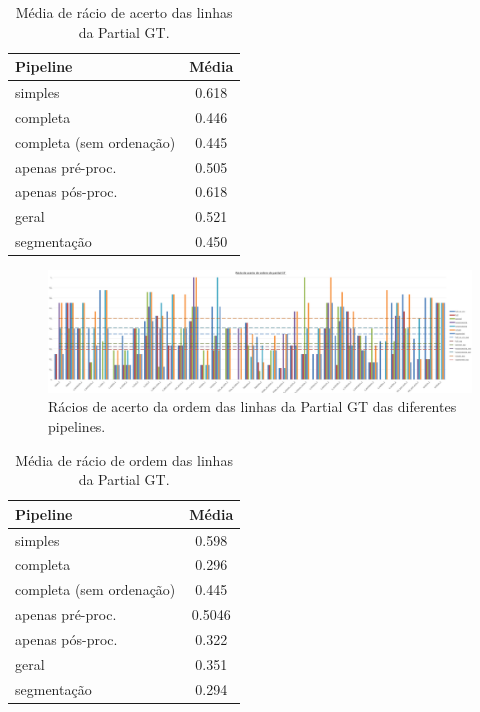 \begin{table}[H]
	\centering
	\begin{tabular}{|l|c|}
		\hline
		\textbf{Pipeline} & \textbf{Média} \\ \hline
		simples & 0.618 				   \\ \hline
		completa & 0.446 				   \\ \hline
		completa (sem ordenação) & 0.445   \\ \hline
		apenas pré-proc. & 0.505 		   \\ \hline
		apenas pós-proc. & 0.618 		   \\ \hline
		geral & 0.521 					   \\ \hline
		segmentação & 0.450 			   \\ \hline
	\end{tabular}
	\caption{Média de rácio de acerto das linhas da Partial GT.}
\end{table}



\begin{figure}[H]
	\centering
	\hspace*{-2cm}
	\includegraphics[width=1.2\textwidth]{images/resultados/graph_pgt_correct_order_ratio.png}
	\caption{Rácios de acerto da ordem das linhas da Partial GT das diferentes pipelines.}
	\label{fig:graph_pgt_correct_order_ratio}
\end{figure}


\begin{table}[H]
	\centering
	\begin{tabular}{|l|c|}
		\hline
		\textbf{Pipeline} & \textbf{Média} \\ \hline
		simples & 0.598 				   \\ \hline
		completa & 0.296 				   \\ \hline
		completa (sem ordenação) & 0.445   \\ \hline
		apenas pré-proc. & 0.5046 		   \\ \hline
		apenas pós-proc. & 0.322 		   \\ \hline
		geral & 0.351 					   \\ \hline
		segmentação & 0.294 			   \\ \hline
	\end{tabular}
	\caption{Média de rácio de ordem das linhas da Partial GT.}
\end{table}



